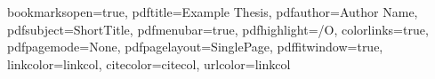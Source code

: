 

\hypersetup
{
bookmarksopen=true,
pdftitle=Example Thesis,
pdfauthor=Author Name,
pdfsubject=ShortTitle, %
pdfmenubar=true, %
pdfhighlight=/O, %
colorlinks=true, %
pdfpagemode=None, %
pdfpagelayout=SinglePage, %
pdffitwindow=true, %
linkcolor=linkcol, %
citecolor=citecol, %
urlcolor=linkcol %
}

\usepackage{draftwatermark} %

%
%

\frontmatter





\newpage
\tableofcontents
\newpage
\renewcommand{\nomname}{Variablenverzeichnis}
\printnomenclature[3em]

\mainmatter


\backmatter

%
%



